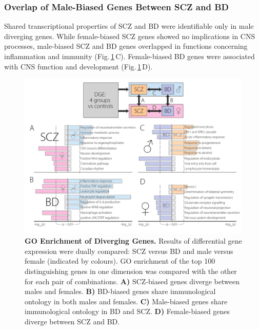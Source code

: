 \subsubsection{Overlap of Male-Biased Genes Between SCZ and BD}
Shared transcriptional properties of SCZ and BD were identifiable only in male diverging genes. While female-biased SCZ genes showed no implications in CNS processes, male-biased SCZ and BD genes overlapped in functions concerning inflammation and immunity (Fig.\,\ref{fig:scz-bd-go}\,C). Female-biased BD genes were associated with CNS function and development (Fig.\,\ref{fig:scz-bd-go}\,D).

\begin{figure}[ht]
\includegraphics[width=\textwidth]{figures/scz-bd-go}
\caption[GO Enrichment of Diverging Genes.]{\textbf{GO Enrichment of Diverging Genes.} Results of differential gene expression were dually compared: SCZ versus BD and male versus female (indicated by colours). GO enrichment of the top 100 distinguishing genes in one dimension was compared with the other for each pair of combinations. \textbf{A)} SCZ-biased genes diverge between males and females. \textbf{B)} BD-biased genes share immunological ontology in both males and females. \textbf{C)} Male-biased genes share immunological ontology in BD and SCZ. \textbf{D)} Female-biased genes diverge between SCZ and BD.
\label{fig:scz-bd-go}}
\end{figure}

